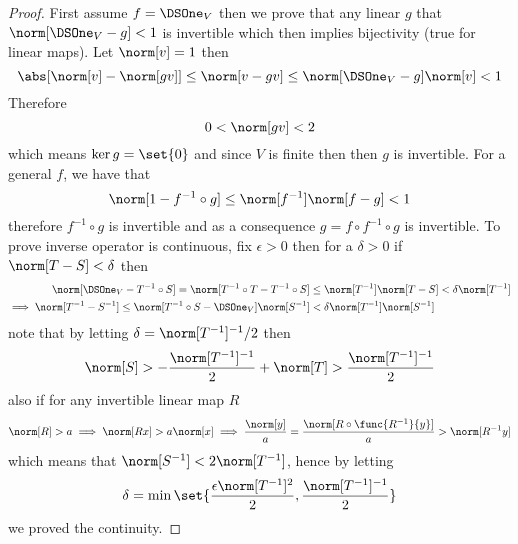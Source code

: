 \begin{proof}
    First assume \(f = \DSOne_V\) then we prove that any linear \(g\) that \(\norm[\DSOne_V - g] < 1\) is invertible which then implies bijectivity (true for linear maps). Let \(\norm[v] = 1\) then
    \begin{equation*}
        \abs[\norm[v] - \norm[gv]] \leq \norm[v - gv] \leq \norm[\DSOne_V - g] \norm[v] < 1
    \end{equation*}
    Therefore
    \begin{equation*}
        0 < \norm[gv] < 2
    \end{equation*}
    which means \(\ker g = \set{0}\) and since \(V\) is finite then then \(g\) is invertible. For a general \(f\), we have that
    \begin{equation*}
        \norm[1 - f^{-1} \circ g] \leq \norm[f^{-1}]\norm[f -g] < 1
    \end{equation*}
    therefore \(f^{-1} \circ g\) is invertible and as a consequence \(g = f \circ f^{-1} \circ g\) is invertible. To prove inverse operator is continuous, fix \(\epsilon > 0\) then for a \(\delta > 0\) if \(\norm[T-S] < \delta\) then
    \begin{align*}
        \norm[\DSOne_V- T^{-1} \circ S]= \norm[T^{-1} \circ T  - T^{-1} \circ S]           & \leq \norm[T^{-1}] \norm[T-S] < \delta \norm[T^{-1}] \\
        \implies  \norm[T^{-1} - S^{-1}] \leq \norm[T^{-1}\circ S - \DSOne_V]\norm[S^{-1}] & < \delta \norm[T^{-1}] \norm[S^{-1}]
    \end{align*}
    note that by letting \(\delta = \norm[T^{-1}]^{-1}/2\) then
    \begin{equation*}
        \norm[S] > -\dfrac{\norm[T^{-1}]^{-1}}{2} + \norm[T] > \dfrac{\norm[T^{-1}]^{-1}}{2}
    \end{equation*}
    also if for any invertible linear map \(R\)
    \begin{equation*}
        \norm[R] > a \implies \norm[Rx] > a\norm[x] \implies \dfrac{\norm[y]}{a} = \dfrac{\norm[R\circ \func{R^{-1}}{y}]}{a} > \norm[R^{-1}y]
    \end{equation*}
    which means that \(\norm[S^{-1}] < 2 \norm[T^{-1}]\), hence by letting
    \begin{equation*}
        \delta = \min \set{\dfrac{\epsilon \norm[T^{-1}]^2}{2} , \dfrac{\norm[T^{-1}]^{-1}}{2}}
    \end{equation*}
    we proved the continuity.
\end{proof}


